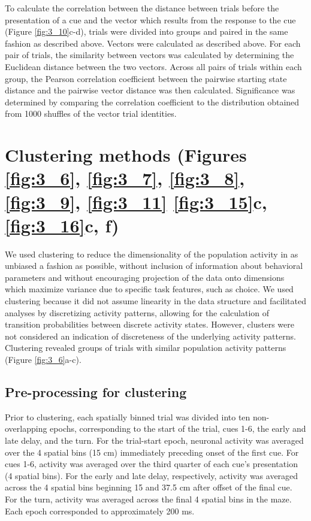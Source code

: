 To calculate the correlation between the distance between trials before the presentation of a cue and the vector which results from the response to the cue (Figure \ref{fig:3_10}c-d), trials were divided into groups and paired in the same fashion as described above. Vectors were calculated as described above. For each pair of trials, the similarity between vectors was calculated by determining the Euclidean distance between the two vectors. Across all pairs of trials within each group, the Pearson correlation coefficient between the pairwise starting state distance and the pairwise vector distance was then calculated. Significance was determined by comparing the correlation coefficient to the distribution obtained from 1000 shuffles of the vector trial identities. 


\section[Clustering methods]{Clustering methods (Figures \ref{fig:3_6}, \ref{fig:3_7}, \ref{fig:3_8}, \ref{fig:3_9}, \ref{fig:3_11} \ref{fig:3_15}c, \ref{fig:3_16}c, f)} \label{methods:clustering_general}

We used clustering to reduce the dimensionality of the population activity in as unbiased a fashion as possible, without inclusion of information about behavioral parameters and without encouraging projection of the data onto dimensions which maximize variance due to specific task features, such as choice. We used clustering because it did not assume linearity in the data structure and facilitated analyses by discretizing activity patterns, allowing for the calculation of transition probabilities between discrete activity states. However, clusters were not considered an indication of discreteness of the underlying activity patterns. Clustering revealed groups of trials with similar population activity patterns (Figure \ref{fig:3_6}a-c). 

\subsection{Pre-processing for clustering} \label{methods:clustering_preprocessing}
Prior to clustering, each spatially binned trial was divided into ten non-overlapping epochs, corresponding to the start of the trial, cues 1-6, the early and late delay, and the turn. For the trial-start epoch, neuronal activity was averaged over the 4 spatial bins (15 cm) immediately preceding onset of the first cue. For cues 1-6, activity was averaged over the third quarter of each cue’s presentation (4 spatial bins). For the early and late delay, respectively, activity was averaged across the 4 spatial bins beginning 15 and 37.5 cm after offset of the final cue. For the turn, activity was averaged across the final 4 spatial bins in the maze. Each epoch corresponded to approximately 200 ms.

